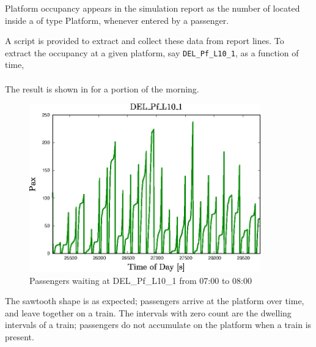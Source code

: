 Platform occupancy appears in the simulation report as the number
of  located inside a  of type Platform,
whenever entered by a passenger.

A script is provided to extract and collect these data from report lines.
To extract the occupancy at a given platform, say {\tt DEL\_Pf\_L10\_1}, as
a function of time,\\
 \\
The result is shown in  for a portion of the morning.
\begin{figure}[!ht]
  \centering
  \includegraphics[angle=0,width=10cm]{90_figs/_Occupancy_DEL_Pf_L10_1.eps}
  \caption{Passengers waiting at DEL\_Pf\_L10\_1 from 07:00 to 08:00}
  \label{PlatOccup}
\end{figure}
The sawtooth shape is as expected; passengers arrive at the platform
over time, and leave together on a train. The intervals with zero
count are the dwelling intervals of a train; passengers do not
accumulate on the platform when a train is present.

